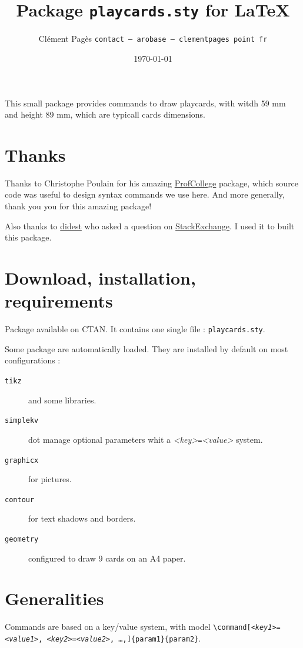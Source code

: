 \documentclass[a4paper, 12pt]{article}
\title{Package \texttt{playcards.sty} for \LaTeX}
\date{\today}
\author{Clément Pagès \texttt{contact -- arobase -- clementpages point fr}}
\newcommand{\package}[1]{\texttt{#1}}
\newcommand{\kv}[2]{\textit{<#1>}\texttt=\textit{<#2>}}
\begin{document}
\maketitle

This small package provides commands to draw playcards, with witdh 59 mm and height 89 mm, which are typicall cards dimensions.

\tableofcontents
\section*{Thanks}
Thanks to Christophe Poulain for his amazing \href{https://ctan.org/pkg/profcollege}{ProfCollege} package, which source code was useful to design syntax commands we use here. And more generally, thank you you for this amazing package!

Also thanks to \href{https://tex.stackexchange.com/users/1948/didest}{didest} who asked a question on \href{https://tex.stackexchange.com/questions/47924/creating-playing-cards-using-tikz}{StackExchange}. I used it to built this package.

\section{Download, installation, requirements}

Package available on CTAN. It contains one single file : \texttt{playcards.sty}.

Some package are automatically loaded. They are installed by default on most configurations :
\begin{description}
	\item[\package{tikz}] and some libraries.
	\item[\package{simplekv}] dot manage optional parameters whit a \kv{key}{value} system.
	\item[\package{graphicx}] for pictures. 
	\item[\package{contour}] for text shadows and borders.
	\item[\package{geometry}] configured to draw 9 cards on an A4 paper.
\end{description}

\section{Generalities}
Commands are based on a key/value system, with model \texttt{\textbackslash command[\kv{key1}{value1}, \kv{key2}{value2}, …,]\{param1\}\{param2\}}.
\end{document}
